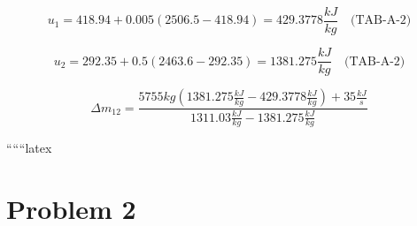 \begin{equation*}
u_1 = 418.94 + 0.005 (2506.5 - 418.94) = 429.3778 \frac{kJ}{kg} \quad \text{(TAB-A-2)}
\end{equation*}

\begin{equation*}
u_2 = 292.35 + 0.5 (2463.6 - 292.35) = 1381.275 \frac{kJ}{kg} \quad \text{(TAB-A-2)}
\end{equation*}

\begin{equation*}
\Delta m_{12} = \frac{5755 kg (1381.275 \frac{kJ}{kg} - 429.3778 \frac{kJ}{kg}) + 35 \frac{kJ}{s}}{1311.03 \frac{kJ}{kg} - 1381.275 \frac{kJ}{kg}}
\end{equation*}

``````latex


\section*{Problem 2}